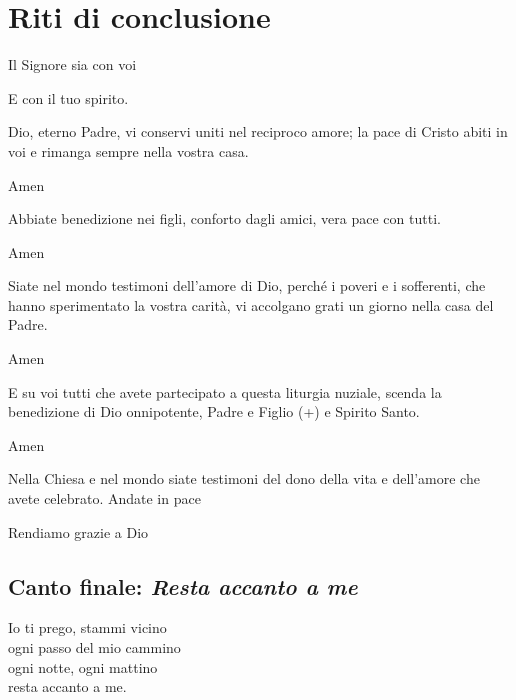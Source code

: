
\section*{Riti di conclusione}

	\begin{dialoghi}
		\item[\sacerdote] Il Signore sia con voi
		\item[\assemblea] E con il tuo spirito.
		\item[\sacerdote] Dio, eterno Padre, vi conservi uniti nel reciproco amore; la pace di Cristo abiti in voi e rimanga sempre nella vostra casa.
		\item[\assemblea] Amen
		\item[\sacerdote] Abbiate benedizione nei figli, conforto dagli amici, vera pace con tutti.
		\item[\assemblea] Amen
		\item[\sacerdote] Siate nel mondo testimoni dell'amore di Dio, perché i poveri e i sofferenti, che hanno sperimentato la vostra carità, vi accolgano grati un giorno nella casa del Padre.
		\item[\assemblea] Amen
		\item[\sacerdote] E su voi tutti che avete partecipato a questa liturgia nuziale, scenda la benedizione di Dio onnipotente, Padre e Figlio (+) e Spirito Santo.
		\item[\assemblea] Amen
		\item[\sacerdote] Nella Chiesa e nel mondo siate testimoni del dono della vita e dell'amore che avete celebrato. Andate in pace
		\item[\assemblea] Rendiamo grazie a Dio
	\end{dialoghi}


\subsection*{Canto finale: \textit{Resta accanto a me}}

	\begin{mystrofe}
	\end{mystrofe}

	\begin{mystrofe}
		Io ti prego, stammi vicino \\
		ogni passo del mio cammino \\
		ogni notte, ogni mattino \\
		resta accanto a me. \\
	\end{mystrofe}

